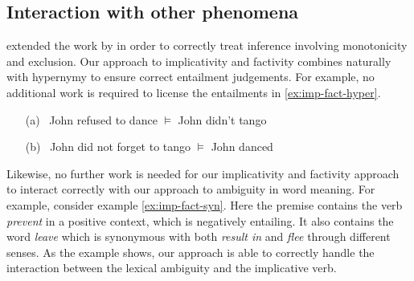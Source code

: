 % 
% 


\subsection*{Interaction with other phenomena}


\citet{maccartney:iwcs2009} extended the work by \citet{nairn:icos2006} in order
to correctly treat inference involving monotonicity and exclusion. Our approach 
to implicativity and factivity combines naturally with hypernymy to ensure
correct entailment judgements. For example, no additional work is required to
license the entailments in \eqref{ex:imp-fact-hyper}.
\begin{covex}\label{ex:imp-fact-hyper}
\begin{itemize} %
  \item[(a)]~John refused to dance $\vDash$ John didn't tango
  \item[(b)]~John did not forget to tango $\vDash$ John danced
\end{itemize}
\end{covex}

Likewise, no further work is needed for our implicativity and factivity approach to interact
correctly with our approach to ambiguity in word meaning.  For example, consider
example \eqref{ex:imp-fact-syn}.  Here the premise contains the verb {\it prevent}
in a positive context, which is negatively entailing.  It also contains the word
{\it leave} which is synonymous with both {\it result in} and {\it flee} through
different senses.  As the example shows, our approach is able to correctly
handle the interaction between the lexical ambiguity and the implicative verb.

